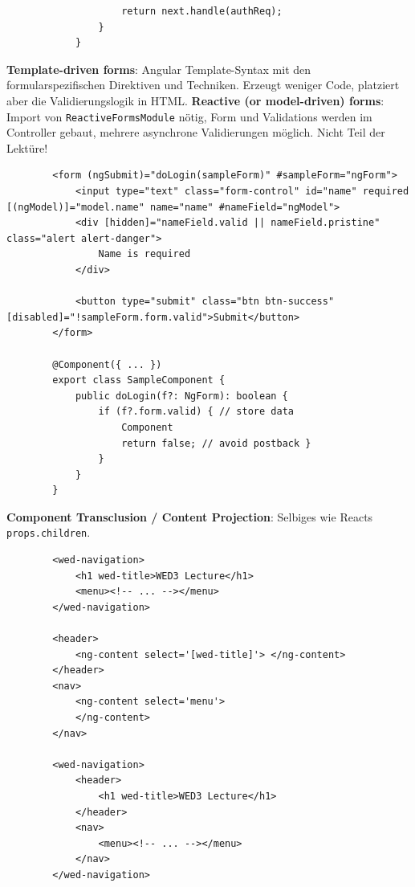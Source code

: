 \documentclass[10pt,landscape]{article}
\begin{document}
\begin{multicols}{3}
\begin{lstlisting}
                    return next.handle(authReq);
                }
            }
        \end{lstlisting}

        \textbf{Template-driven forms}: Angular Template-Syntax mit den formularspezifischen Direktiven und Techniken.
        Erzeugt weniger Code, platziert aber die Validierungslogik in HTML.
        \textbf{Reactive (or model-driven) forms}: Import von \lstinline{ReactiveFormsModule} nötig, Form und Validations werden im Controller gebaut, mehrere asynchrone Validierungen möglich.
        Nicht Teil der Lektüre!

        \begin{lstlisting}
        <form (ngSubmit)="doLogin(sampleForm)" #sampleForm="ngForm">
            <input type="text" class="form-control" id="name" required [(ngModel)]="model.name" name="name" #nameField="ngModel">
            <div [hidden]="nameField.valid || nameField.pristine" class="alert alert-danger">
                Name is required
            </div>

            <button type="submit" class="btn btn-success" [disabled]="!sampleForm.form.valid">Submit</button>
        </form>

        @Component({ ... })
        export class SampleComponent {
            public doLogin(f?: NgForm): boolean {
                if (f?.form.valid) { // store data
                    Component
                    return false; // avoid postback }
                }
            }
        }
        \end{lstlisting}

        \textbf{Component Transclusion / Content Projection}: Selbiges wie Reacts \lstinline{props.children}.

        \begin{lstlisting}
        <wed-navigation>
            <h1 wed-title>WED3 Lecture</h1>
            <menu><!-- ... --></menu>
        </wed-navigation>

        <header>
            <ng-content select='[wed-title]'> </ng-content>
        </header>
        <nav>
            <ng-content select='menu'>
            </ng-content>
        </nav>

        <wed-navigation>
            <header>
                <h1 wed-title>WED3 Lecture</h1>
            </header>
            <nav>
                <menu><!-- ... --></menu>
            </nav>
        </wed-navigation>
        \end{lstlisting}




\end{multicols}
\end{document}
